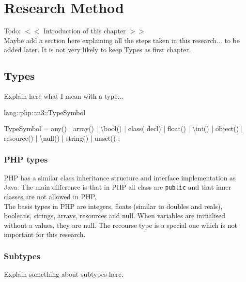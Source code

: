 \documentclass[../main.tex]{subfiles}
\begin{document}
    \chapter{Research Method}\label{chap:research_method}
    Todo:
    $<<$ Introduction of this chapter $>>$
    \\
    Maybe add a section here explaining all the steps taken in this research... to be added later.
    It is not very likely to keep Types as first chapter.
    \blindtext %
    
    \section{Types}
    Explain here what I mean with a type...
    
    \begin{rascal}
 lang::php::m3::TypeSymbol

 TypeSymbol
  = any()
  | array()
  | \textbackslash{}bool()
  | class( decl)
  | float()
  | \textbackslash{}int()
  | object()
  | resource()
  | \textbackslash{}null()
  | string()
  | unset()
  ; 
    \end{rascal}
    
    \subsection{PHP types}
    PHP has a similar class inheritance structure and interface implementation as Java.
    The main difference is that in PHP all class are \texttt{public} and that inner classes are not allowed in PHP. 
    \\
    The basis types in PHP are integers, floats (similar to doubles and reals), booleans, strings, arrays, resources and null.
    When variables are initialised without a values, they are null. The recourse type is a special one which is not important for this research.
 
    \subsection{Subtypes}
    
    Explain something about subtypes here.

    \blindtext %
    
\end{document}
